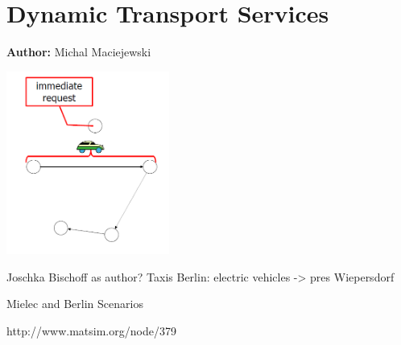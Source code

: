 \chapter{Dynamic Transport Services }
\label{ch:dts}

\hfill \textbf{Author:} Michal Maciejewski

\begin{center} \includegraphics[width=0.4\textwidth, angle=0]{extending/figures/DTS/dts.png} \end{center}

Joschka Bischoff as author?
Taxis Berlin: electric vehicles -> pres Wiepersdorf

Mielec and Berlin Scenarios

http://www.matsim.org/node/379
